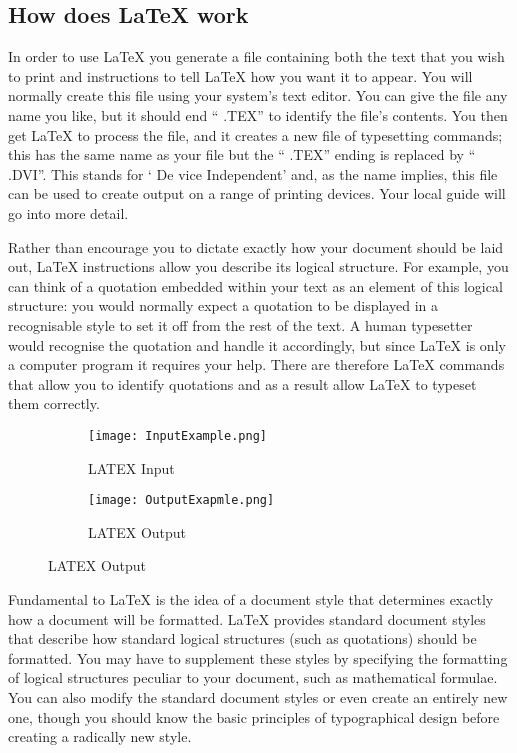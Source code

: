 \documentclass[12pt, document]{article}
\begin{document}
\pagebreak

\begin{center}
\chapter{\textbf{How does LaTeX work}}
\end{center}

\hspace{1cm} In order to use LaTeX you generate a file containing both the text that you wish to print and instructions to tell LaTeX how you want it to appear. You will normally create this file using your system's text editor. You can give the file any name you like, but it should end `` .TEX'' to identify the file's contents. You then get LaTeX to process the file, and it creates a new file of typesetting commands; this has the same name as your file but the `` .TEX'' ending is replaced by `` .DVI''. This stands for ` De vice Independent' and, as the name implies, this file can be used to create output on a range of printing devices. Your local guide will go into more detail.

Rather than encourage you to dictate exactly how your document should be laid out, LaTeX instructions allow you describe its logical structure. For example, you can think of a quotation embedded within your text as an element of this logical structure: you would normally expect a quotation to be displayed in a recognisable style to set it off from the rest of the text. A human typesetter would recognise the quotation and handle it accordingly, but since LaTeX is only a computer program it requires your help. There are therefore LaTeX commands that allow you to identify quotations and as a result allow LaTeX to typeset them correctly. \vspace{0.7cm}


\begin{figure}[H]
\centering
\begin{subfigure}{.5\textwidth}
  \centering
  \texttt{[image: InputExample.png]}
  \caption{LATEX Input}
  \label{fig:sub1}
\end{subfigure}%
\begin{subfigure}{.5\textwidth}
  \centering
  \texttt{[image: OutputExapmle.png]}
  \caption{LATEX Output}
  \label{fig:sub2}
\end{subfigure}
\end{figure}


Fundamental to LaTeX is the idea of a document style that determines exactly how a document will be formatted. LaTeX provides standard document styles that describe how standard logical structures (such as quotations) should be formatted. You may have to supplement these styles by specifying the formatting of logical structures peculiar to your document, such as mathematical formulae. You can also modify the standard document styles or even create an entirely new one, though you should know the basic principles of typographical design before creating a radically new style.
\thispagestyle{empty}
\end{document}
